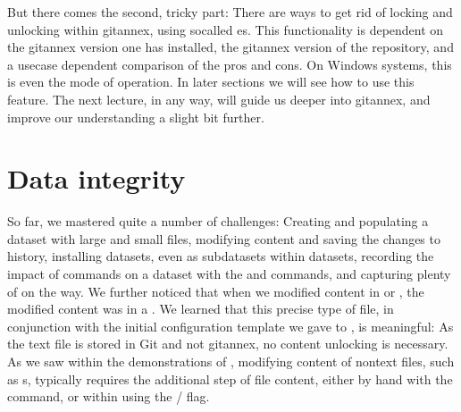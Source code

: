 \ignorespaces 
\sphinxAtStartPar
But there comes the second, tricky part: There are ways to get rid of locking and
unlocking within git\sphinxhyphen{}annex, using so\sphinxhyphen{}called {\hyperref[\detokenize{glossary:term-adjusted-branch}]{}}es.
This functionality is dependent on the git\sphinxhyphen{}annex version one has installed, the git\sphinxhyphen{}annex version of the repository, and a use\sphinxhyphen{}case dependent comparison of the pros and cons.
On Windows systems, this {\hyperref[\detokenize{glossary:term-adjusted-mode}]{}} is even the  mode of operation.
In later sections we will see how to use this feature.
The next lecture, in any way, will guide us deeper into git\sphinxhyphen{}annex, and improve our understanding a slight bit further.

\sphinxstepscope


\section{Data integrity}
\label{\detokenize{basics/101-115-symlinks:data-integrity}}\label{\detokenize{basics/101-115-symlinks:symlink}}\label{\detokenize{basics/101-115-symlinks:id1}}\label{\detokenize{basics/101-115-symlinks::doc}}
\sphinxAtStartPar
So far, we mastered quite a number of challenges:
Creating and populating a dataset with large and small files, modifying content and saving the changes to history, installing datasets, even as subdatasets within datasets, recording the impact of commands on a dataset with the  and  commands, and capturing plenty of {\hyperref[\detokenize{glossary:term-provenance}]{}} on the way.
We further noticed that when we modified content in  or , the modified content was in a .
We learned that this precise type of file, in conjunction with the initial configuration template  we gave to , is meaningful:
As the text file is stored in Git and not git\sphinxhyphen{}annex, no content unlocking is necessary.
As we saw within the demonstrations of , modifying content of non\sphinxhyphen{}text files, such as s, typically requires the additional step of  file content, either by hand with the  command, or within  using the / flag.

